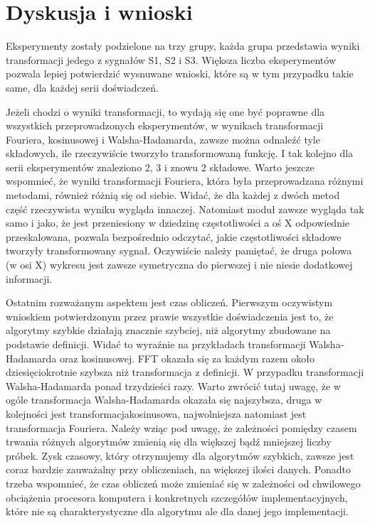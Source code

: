 \documentclass{article}
\begin{document}
\section{Dyskusja i wnioski}
        Eksperymenty zostały podzielone na trzy grupy, każda grupa
        przedstawia wyniki transformacji jedego z sygnałów S1, S2 i
        S3. Większa liczba eksperymentów pozwala lepiej potwierdzić
        wysnuwane wnioski, które są w tym przypadku takie same, dla
        każdej serii doświadczeń.

        Jeżeli chodzi o wyniki transformacji, to wydają się one
        być poprawne dla wszystkich przeprowadzonych eksperymentów, w
        wynikach transformacji Fouriera, kosinusowej i
        Walsha-Hadamarda, zawsze można odnaleźć tyle składowych, ile
        rzeczywiście tworzyło transformowaną funkcję. I tak kolejno
        dla serii eksperymentów znaleziono 2, 3 i znowu 2 składowe.
        Warto jeszcze wspomnieć, że wyniki transformacji Fouriera,
        która była przeprowadzana różnymi metodami, również różnią się
        od siebie. Widać, że dla każdej z dwóch metod część
        rzeczywista wyniku wygląda innaczej. Natomiast moduł zawsze
        wygląda tak samo i jako, że jest przeniesiony w dziedzinę
        częstotliwości a oś X odpowiednie przeskalowana, pozwala
        bezpośrednio odczytać, jakie częstotliwości składowe tworzyły
        transformowany sygnał. Oczywiście należy pamiętać, że druga
        połowa (w osi X) wykresu jest zawsze symetryczna do pierwszej
        i nie niesie dodatkowej informacji.

        Ostatnim rozważanym aspektem jest czas obliczeń. Pierwszym
        oczywistym wnioskiem potwierdzonym przez prawie wszystkie
        doświadczenia jest to, że algorytmy
        szybkie działają znacznie szybciej, niż algorytmy zbudowane na
        podstawie definicji. Widać to wyraźnie na przykładach
        transformacji Walsha-Hadamarda oraz kosinusowej. 
        FFT okazała się za każdym razem około
        dziesięciokrotnie szybsza niż transformacja z definicji. 
        W przypadku transformacji Walsha-Hadamarda ponad
        trzydzieści razy. Warto zwrócić tutaj uwagę, że w ogóle
        transformacja Walsha-Hadamarda okazała się najszybsza, druga w
        kolejności jest transformacjakosinusowa, najwolniejsza natomiast jest
        transformacja Fouriera. Należy wziąc pod uwagę, że
        zależności pomiędzy czasem trwania różnych algorytmów zmienią
        się dla większej bądź mniejszej liczby próbek. Zysk czasowy,
        który otrzymujemy dla algorytmów szybkich, zawsze jest coraz
        bardzie zauważalny przy obliczeniach, na większej ilości
        danych. Ponadto trzeba wspomnieć, że czas obliczeń może
        zmieniać się w zależności od chwilowego obciążenia procesora
        komputera i konkretnych szczegółów implementacyjnych, które
        nie są charakterystyczne dla algorytmu ale dla danej jego
        implementacji.
    
\end{document}
